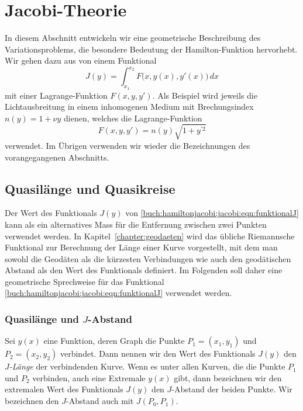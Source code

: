 %
%
%
\section{Jacobi-Theorie
\label{buch:hamiltonjacobi:section:jacobi}}

In diesem Abschnitt entwickeln wir eine geometrische Beschreibung des
Variationsproblems, die besondere Bedeutung der Hamilton-Funktion hervorhebt.
Wir gehen dazu aus von einem Funktional
\begin{equation}
J(y)
=
\int_{x_1}^{x_2}
F\bigl(x,y(x),y'(x)\bigr)
\,dx
\label{buch:hamiltonjacobi:jacobi:eqn:funktionalJ}
\end{equation}
mit einer Lagrange-Funktion $F(x,y,y')$.
Als Beispiel wird jeweils die Lichtausbreitung in einem inhomogenen
Medium mit Brechungsindex $n(y) = 1+\nu y$ dienen, welches die
Lagrange-Funktion
\begin{equation}
F(x,y,y')
=
n(y) \sqrt{1+y^{\prime 2}}
\label{buch:hamiltonjacobi:jacobi:eqn:beispielF}
\end{equation}
verwendet.
Im Übrigen verwenden wir wieder die Bezeichnungen des vorangegangenen
Abschnitts.

%
%
\subsection{Quasilänge und Quasikreise
\label{buch:hamiltonjacobi:jacobi:subsection:quasi}}
Der Wert des Funktionals $J(y)$ von
\eqref{buch:hamiltonjacobi:jacobi:eqn:funktionalJ}
kann als ein alternatives Mass für die Entfernung zwischen
zwei Punkten verwendet werden.
In Kapitel~\ref{chapter:geodaeten} wird das übliche Riemannsche
Funktional zur Berechnung der Länge einer Kurve vorgestellt, mit dem
man sowohl die Geodäten als die kürzesten Verbindungen wie auch
den geodätischen Abstand als den Wert des Funktionals definiert.
Im Folgenden soll daher eine geometrische Sprechweise für das Funktional 
\eqref{buch:hamiltonjacobi:jacobi:eqn:funktionalJ}
verwendet werden.

%
%
\subsubsection{Quasilänge und $J$-Abstand}
Sei $y(x)$ eine Funktion, deren Graph die Punkte $P_1=(x_1,y_1)$
und $P_2=(x_2,y_2)$ verbindet.
Dann nennen wir den Wert des Funktionals $J(y)$ den {\em $J$-Länge}
%
der verbindenden Kurve.
Wenn es unter allen Kurven, die die Punkte $P_1$  und $P_2$ verbinden,
auch eine Extremale $y(x)$ gibt, dann bezeichnen wir den extremalen
Wert des Funktionals $J(y)$ den $J$-Abstand der beiden Punkte.
Wir bezeichnen den $J$-Abstand auch mit $J(P_0,P_1)$.

